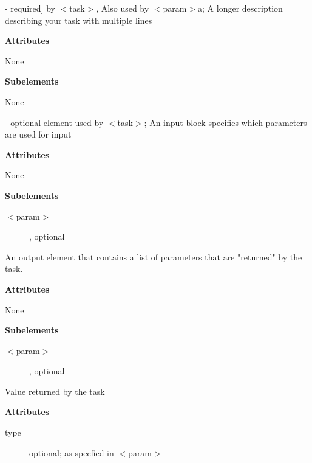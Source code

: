 \begin{description}
\item [$<$description$>$] - required] by $<$task$>$, Also used by $<$param$>$a; A longer description describing your task with multiple lines
\begin{description}
\item \textbf{Attributes}
\begin{description}
\item None
\end{description}
\item \textbf{Subelements}
\begin{description}
\item None
\end{description}
\end{description}
\item[$<$input$>$] - optional element used by $<$task$>$;
 An input block specifies which parameters are used for input
\begin{description}
\item \textbf{Attributes}
\begin{description}
\item None
\end{description}
\item \textbf{Subelements}
\begin{description}
\item [$<$param$>$], optional
\end{description}
\end{description}
\item[$<$output$>$ - optional]
An output element that contains a list of parameters that are "returned" by the task.
\begin{description}
\item \textbf{Attributes}
\begin{description}
\item None
\end{description}
\item \textbf{Subelements}
\begin{description}
\item [$<$param$>$], optional
\end{description}
\end{description}
\item [$<$returns$>$ - optional]
Value returned by the task
\begin{description}
\item \textbf{Attributes}
\begin{description}
\item [type] optional; as specfied in $<$param$>$

\end{description}
\end{description}
\end{description}
